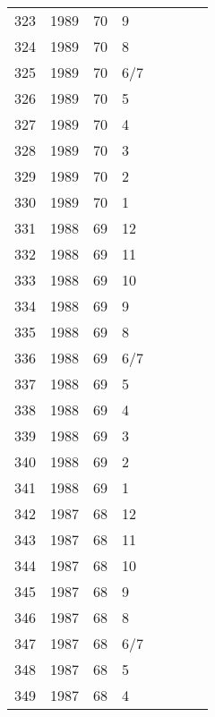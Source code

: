 \begin{longtable}{ |l|l|l|l|l|l|l|l| }
323 & 1989 & 70 &     9 &         &                &  & \\
324 & 1989 & 70 &     8 &         &                &  & \\
325 & 1989 & 70 &   6/7 &         &                &  & \\
326 & 1989 & 70 &     5 &         &                &  & \\
327 & 1989 & 70 &     4 &         &                &  & \\
328 & 1989 & 70 &     3 &         &                &  & \\
329 & 1989 & 70 &     2 &         &                &  & \\
330 & 1989 & 70 &     1 &         &                &  & \\
331 & 1988 & 69 &    12 &         &                &  & \\
332 & 1988 & 69 &    11 &         &                &  & \\
333 & 1988 & 69 &    10 &         &                &  & \\
334 & 1988 & 69 &     9 &         &                &  & \\
335 & 1988 & 69 &     8 &         &                &  & \\
336 & 1988 & 69 &   6/7 &         &                &  & \\
337 & 1988 & 69 &     5 &         &                &  & \\
338 & 1988 & 69 &     4 &         &                &  & \\
339 & 1988 & 69 &     3 &         &                &  & \\
340 & 1988 & 69 &     2 &         &                &  & \\
341 & 1988 & 69 &     1 &         &                &  & \\
342 & 1987 & 68 &    12 &         &                &  & \\
343 & 1987 & 68 &    11 &         &                &  & \\
344 & 1987 & 68 &    10 &         &                &  & \\
345 & 1987 & 68 &     9 &         &                &  & \\
346 & 1987 & 68 &     8 &         &                &  & \\
347 & 1987 & 68 &   6/7 &         &                &  & \\
348 & 1987 & 68 &     5 &         &                &  & \\
349 & 1987 & 68 &     4 &         &                &  & \\

\end{longtable}
